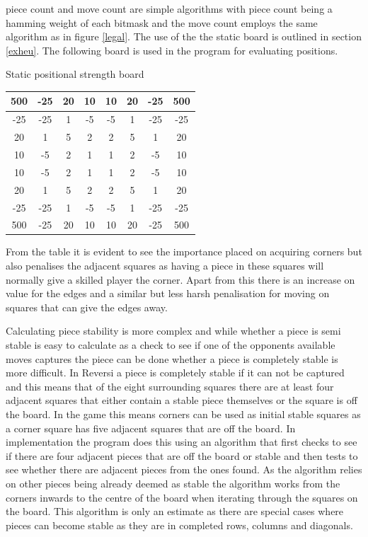 \documentclass[final]{cmpreport}
\begin{document}
piece count and move count are simple algorithms with piece count being a hamming weight of each bitmask and the move count employs the same algorithm as in figure \ref{legal}. The use of the the static board is outlined in section \ref{exheu}. The following board is used in the program for evaluating positions.

\begin{cmptable}[htb]{Static positional strength board}
	\begin{tabular}{c|c|c|c|c|c|c|c}
		500 & -25 & 20 & 10 & 10 & 20 & -25 & 500 \\ \hline
		-25 & -25 & 1 & -5 & -5 & 1 & -25 & -25 \\ \hline
		20 & 1 & 5 & 2 & 2 & 5 & 1 & 20 \\ \hline
		10 & -5 & 2 & 1 & 1 & 2 & -5 & 10 \\ \hline
		10 & -5 & 2 & 1 & 1 & 2 & -5 & 10 \\ \hline
		20 & 1 & 5 & 2 & 2 & 5 & 1 & 20 \\ \hline
		-25 & -25 & 1 & -5 & -5 & 1 & -25 & -25 \\ \hline
		500 & -25 & 20 & 10 & 10 & 20 & -25 & 500 \\
	\end{tabular}
\end{cmptable}
\FloatBarrier
From the table it is evident to see the importance placed on acquiring corners but also penalises the adjacent squares as having a piece in these squares will normally give a skilled player the corner. Apart from this there is an increase on value for the edges and a similar but less harsh penalisation for moving on squares that can give the edges away.

Calculating piece stability is more complex and while whether a piece is semi stable is easy to calculate as a check to see if one of the opponents available moves captures the piece can be done whether a piece is completely stable is more difficult. In Reversi a piece is completely stable if it can not be captured and this means that of the eight surrounding squares there are at least four adjacent squares that either contain a stable piece themselves or the square is off the board. In the game this means corners can be used as initial stable squares as a corner square has five adjacent squares that are off the board. In implementation the program does this using an algorithm that first checks to see if there are four adjacent pieces that are off the board or stable and then tests to see whether there are adjacent pieces from the ones found. As the algorithm relies on other pieces being already deemed as stable the algorithm works from the corners inwards to the centre of the board when iterating through the squares on the board. This algorithm is only an estimate as there are special cases where pieces can become stable as they are in completed rows, columns and diagonals.
\end{document}
